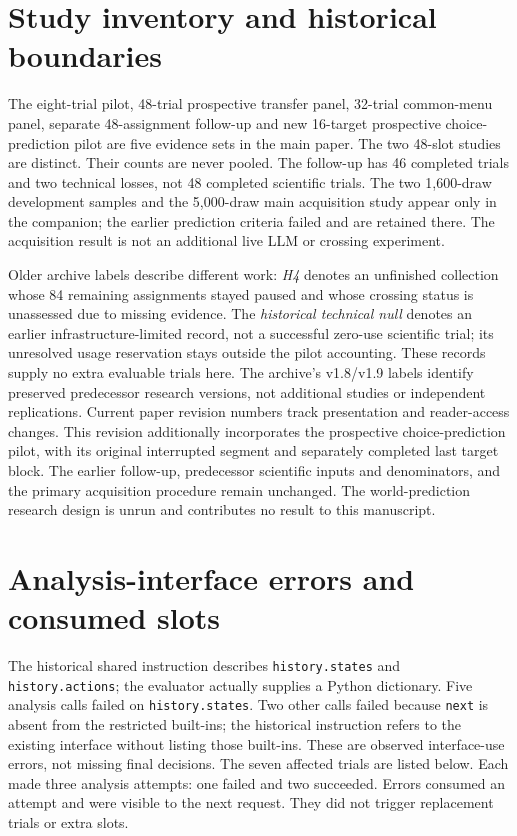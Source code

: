 \section{Study inventory and historical boundaries}
\label{app:inventory}
The eight-trial pilot, 48-trial prospective transfer panel, 32-trial
common-menu panel, separate 48-assignment follow-up and new 16-target
prospective choice-prediction pilot are five evidence sets in the main paper. The two 48-slot studies are distinct. Their counts are
never pooled. The follow-up has 46 completed trials and two technical losses,
not 48 completed scientific trials. The two 1,600-draw development samples and the
5,000-draw main acquisition study appear only in the companion; the earlier
prediction criteria failed and are retained there. The acquisition result
is not an additional live LLM or crossing experiment.

Older archive labels describe different work: \emph{H4} denotes an unfinished
collection whose 84 remaining assignments stayed paused and whose crossing
status is unassessed due to missing evidence. The \emph{historical technical
null} denotes an earlier infrastructure-limited record, not a successful
zero-use scientific trial; its unresolved usage reservation stays outside
the pilot accounting. These records supply no extra evaluable trials here.
The archive's v1.8/v1.9 labels identify preserved predecessor research
versions, not additional studies or independent replications. Current paper
revision numbers track presentation and reader-access changes. This revision
additionally incorporates the prospective choice-prediction pilot, with its
original interrupted segment and separately completed last target block.
The earlier follow-up, predecessor scientific inputs and denominators, and
the primary acquisition procedure remain unchanged. The world-prediction
research design is unrun and contributes no result to this manuscript.

\section{Analysis-interface errors and consumed slots}
\label{app:interface-audit}
The historical shared instruction describes \texttt{history.states} and
\texttt{history.actions}; the evaluator actually supplies a Python dictionary.
Five analysis calls failed on \texttt{history.states}. Two other calls failed
because \texttt{next} is absent from the restricted built-ins; the historical
instruction refers to the existing interface without listing those built-ins.
These are observed interface-use errors, not missing final decisions. The
seven affected trials are listed below. Each made three analysis attempts:
one failed and two succeeded. Errors consumed an attempt and were visible
to the next request. They did not trigger replacement trials or extra slots.

